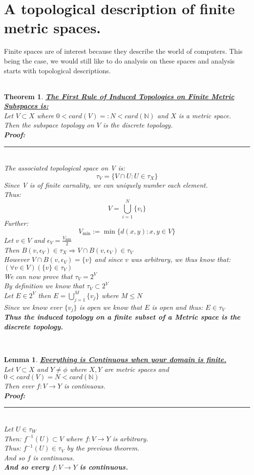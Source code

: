 \documentclass[12pt]{extarticle}
\theoremstyle{plain}
\newtheorem{thm}{Theorem}[section]
\theoremstyle{plain}
\theoremstyle{plain}
\newtheorem{lma}{Lemma}[section]
\theoremstyle{Definition}
\theoremstyle{Definition}
\theoremstyle{plain}
\theoremstyle{plain}
\newcommand{\cut}[0]{\noindent\framebox[\linewidth]{\rule{\linewidth}{2pt}}\\}
\newcommand{\prof}[0]{	\noindent \textbf{Proof:} \rule{500pt}{2pt} \\ }
\begin{document}
	\section{A topological description of finite metric spaces.}
	Finite spaces are of interest because they describe the world of computers. This being the case, we would still like to do analysis on these spaces and analysis starts with topological descriptions. \\
	\cut
	\begin{thm} \underline{\textbf{The First Rule of Induced Topologies on Finite Metric Subspaces is:}} \\
		Let $V \subset X$ where $0 < card(V) =: N < card(\mathbb{N})$ and $X$ is a metric space. \\
		Then the subspace topology on $V$ is the discrete topology. \\ 
		\prof
		The associated topological space on V is: 
		$$\tau_V = \{V \cap U : U \in \tau_X\}$$
		Since V is of finite carnality, we can uniquely number each element. \\ 
		Thus:
		$$V = \bigcup_{i=1}^N \{v_i\}$$
		Further: 
		$$V_{\min} := \min\{d(x,y) : x,y \in V\} $$
		Let $v \in V$ and $\epsilon_V = \frac{V_{\min}}{2}$ \\ 
		Then $B(v,\epsilon_V) \in \tau_X \Rightarrow V \cap B(v,\epsilon_V) \in \tau_V$ \\ 
		However $V \cap B(v,\epsilon_V)  = \{v\}$ and since $v$ was arbitrary, we thus know that: $(\forall v \in V)(\{v\} \in \tau_V)$ \\
		We can now prove that $\tau_V = 2^V$ \\ 
		By definition we know that $\tau_V \subset 2^V$ \\ 
		Let $E \in 2^V$ then $E = \bigcup_{j=1}^M \{v_j\}$ where $M \leq N$ \\ 
		Since we know ever $\{v_j\}$ is open we know that $E$ is open and thus: $E \in \tau_V$ \\ 
		\textbf{Thus the induced topology on a finite subset of a Metric space is the discrete topology. }		
	\end{thm}
	\cut
	\begin{lma} \underline{\textbf{Everything is Continuous when your domain is finite.}} \\ 
			Let $V \subset X$ and $Y \not = \phi$ where $X,Y$ are metric spaces and $0 < card(V) = N < card(\mathbb{N})$ \\
			Then ever $f : V \to Y$ is continuous. \\ 
			\prof
			Let $U \in \tau_W$ \\ 
			Then: $f^{-1}(U) \subset V$ where $f : V \to Y$ is arbitrary. \\
			Thus: $f^{-1}(U) \in \tau_V$ by the previous theorem. \\
			And so $f$ is continuous. \\
			\textbf{And so every $f : V \to Y$ is continuous. }
	\end{lma}
\end{document}
